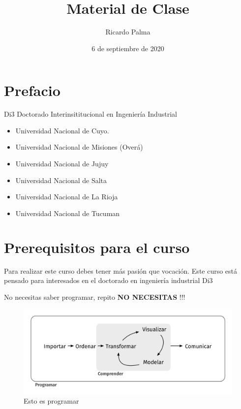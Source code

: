 \documentclass[]{article}
\title{Material de Clase}
\author{Ricardo Palma}
\date{6 de septiembre de 2020}
\providecommand{\tightlist}{%
  \setlength{\itemsep}{0pt}\setlength{\parskip}{0pt}}
\begin{document}
\maketitle

{
\setcounter{tocdepth}{2}
\tableofcontents
}
\section*{Prefacio}\label{prefacio}

Di3 Doctorado Interinsititucional en Ingeniería Industrial

\begin{itemize}
\tightlist
\item
  Universidad Nacional de Cuyo.
\item
  Universidad Nacional de Misiones (Overá)
\item
  Universidad Nacional de Jujuy
\item
  Universidad Nacional de Salta
\item
  Universidad Nacional de La Rioja
\item
  Universidad Nacional de Tucuman
\end{itemize}

\section{Prerequisitos para el curso}\label{prerequisitos-para-el-curso}

Para realizar este curso debes tener más pasión que vocación. Este curso
está pensado para interesados en el doctorado en ingeniería industrial
Di3

No necesitas saber programar, repito \textbf{NO NECESITAS} !!!

\begin{figure}
\centering
\includegraphics{data-science.png}
\caption{Esto es programar}
\end{figure}
\end{document}
